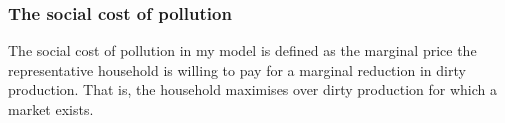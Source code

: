 \begin{comment}
content...
\paragraph{If a reduction in dirty labor share is efficient, then the aggregate production function features decreasing returns to scale in labor}
\begin{proof}
	\textit{The proof rest on the assumption that returns to scale are symmetric across dirty and clean production; either both decreasing or both are non-decreasing.}
It holds by assumption that $s_{FB,E>0}<s_{FB,E=0}$, where $E>0$ indicates that the externality is active. 
Assume by contradiction that the aggregate production function features non-decreasing returns to scale. This implies that:
\begin{align}
\left. \frp{Y}{L_f} \right|_{s_{FB,E>0}}\leq \left. \frp{Y}{L_f} \right|_{s_{FB,E=0}},\\
\left. \frp{Y}{L_g} \right|_{s_{FB,E>0}}\geq \left. \frp{Y}{L_g} \right|_{s_{FB,E=0}}.
\end{align}
When there is no externality, the efficient allocation is characterized by
\begin{align}
\left. \frp{Y}{L_f} \right|_{s_{FB,E=0}}= \left. \frp{Y}{L_g} \right|_{s_{FB,E=0}}.
\end{align}
Using the inequalities above yields
\begin{align}
\left. \frp{Y}{L_f} \right|_{s_{FB,E>0}}\leq \left. \frp{Y}{L_g} \right|_{s_{FB,E>0}}.
\end{align}
This contradicts the optimality condition which requires 
\begin{align}
\left. \frp{Y}{L_f} \right|_{s_{FB,E>0}}> \left. \frp{Y}{L_g} \right|_{s_{FB,E>0}}.
\end{align}
Hence, when a reduction in the dirty labor share is efficient, then the aggregate production function features decreasing returns to scale in both labor input goods. 
\end{proof}
\end{comment}

\subsubsection{The social cost of pollution}

The social cost of pollution in my model is defined as the marginal price the representative household is willing to pay for a marginal reduction in dirty production. That is, the household maximises over dirty production for which a market exists.

